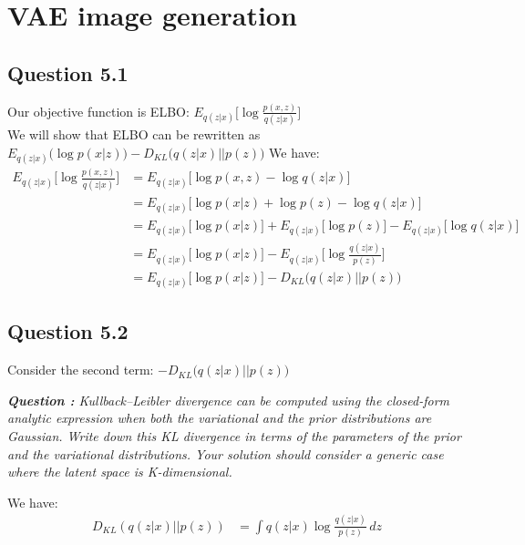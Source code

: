 \documentclass{article}
\begin{document}
\section{VAE image generation}
\subsection*{Question 5.1}
Our objective function is ELBO: $E_{q(z|x)}\big[\log \frac{p(x,z)}{q(z|x)}\big]$ \\
We will show that ELBO can be rewritten as $E_{q(z|x)}\big(\log p(x|z)\big) - D_{KL} \big( q(z|x) \lvert \rvert  p(z)\big)$
We have:
\begin{align*}
  E_{q(z|x)}\big[\log \frac{p(x,z)}{q(z|x)}\big] & = E_{q(z|x)}\big[\log p(x,z) - \log q(z|x)\big]                                                     \\
                                                 & = E_{q(z|x)}\big[\log p(x|z) + \log p(z) - \log q(z|x)\big]                                         \\
                                                 & = E_{q(z|x)}\big[\log p(x|z)\big] + E_{q(z|x)}\big[\log p(z)\big] - E_{q(z|x)}\big[\log q(z|x)\big] \\
                                                 & = E_{q(z|x)}\big[\log p(x|z)\big] - E_{q(z|x)}\big[\log \frac{q(z|x)}{p(z)}\big]                    \\
                                                 & = E_{q(z|x)}\big[\log p(x|z)\big] - D_{KL} \big( q(z|x) \lvert \rvert  p(z)\big)
\end{align*}

\subsection*{Question 5.2}
Consider the second term: $- D_{KL} \big( q(z|x) \lvert \rvert  p(z)\big)$

\textit{\textbf{Question :} Kullback–Leibler divergence can be computed using the closed-form analytic expression when both the variational and the prior distributions are Gaussian. Write down this KL divergence in terms of the parameters of the prior and the variational distributions. Your solution should consider a generic case where the latent space is K-dimensional.}

We have:
\begin{align*}
  D_{KL} \left(q(z|x) \lvert\rvert p(z)\right) & = \int q(z|x) \log \frac{q(z|x)}{p(z)} \,dz
\end{align*}
\end{document}
